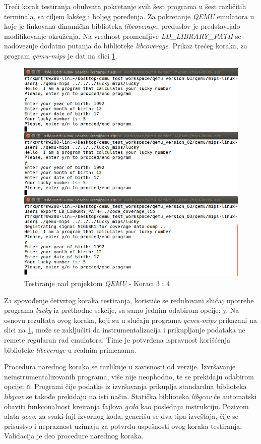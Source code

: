 \documentclass[12pt,oneside]{memoir}
\newcommand{\kod}[1]{\texttt{#1}}
\newcommand{\strano}[1]{\textit{#1}}
\begin{document}
Treći korak testiranja obuhvata pokretanje svih šest programa u šest različitih terminala, sa ciljem lakšeg i boljeg poređenja.  Za pokretanje \strano{QEMU} emulatora u koje je linkovana dinamička biblioteka \strano{libcoverage}, preduslov je predstavljalo modifikovanje okruženja. Na vrednost promenljive \strano{LD\_LIBRARY\_PATH} se nadovezuje dodatno putanja do biblioteke \strano{libcoverage}. Prikaz trećeg koraka, za program \strano{qemu-mips} je dat na slici \ref{fig:qemu-test-34}.


\begin{figure}[!ht]
  \centering
  \includegraphics[width=\textwidth]{img/qemu-test-23-ng.png}
  \caption{Testiranje nad projektom \strano{QEMU} - Koraci 3 i 4}
  \label{fig:qemu-test-34}
\end{figure} 

Za spovođenje četvrtog koraka testiranja, koristiće se redukovani slučaj upotrebe programa \strano{lucky} iz prethodne sekcije, sa samo jednim odabirom opcije: y. Na osnovu rezultata ovog koraka, koji su u slučaju programa \strano{qemu-mips} prikazani na slici na \ref{fig:qemu-test-34}, može se zaključiti da instrumentalizacija i prikupljanje podataka ne remete regularan rad emulatora. Time je potvrđena ispravnost korišćenja biblioteke \strano{libcverage} u realnim primenama. 

Procedura narednog koraka se razlikuje u zavisnosti od verzije. Izvršavanje neinstrumentalizovanih programa, više nije neophodno, te se prekidaju odabirom opcije: \kod{n}. Programi čije podatke iz izvršavanja prikuplja standardna biblioteka \strano{libgcov} se takođe prekidaju na isti način. Statička biblioteka \strano{libgcov} će automatski obaviti funkconalnost kreiranja fajlova \strano{gcda} kao poslednju instrukciju. Pozivom alata \strano{gcov}, za svaki fajl izvornog koda, generišu se dva tipa izveštaja, čije se prisustvo i nepraznost uzimaju za potvrdu uspešnosti ovog koraka testiranja. Validacija je deo procedure narednog koraka. 
\end{document}

